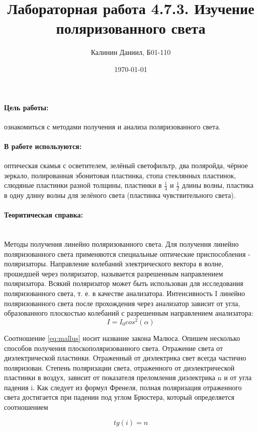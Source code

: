 \documentclass[a4paper, 12pt]{article}
\author{Калинин Даниил, Б01-110}
\date{\today}
\title{Лабораторная работа 4.7.3. Изучение поляризованного света}
\newcommand{\parag}[1]{\paragraph*{#1:}}
\begin{document}
\maketitle
\parindent=0cm

\parag {Цель работы}
ознакомиться с методами получения и анализа 
поляризованного света.

\parag {В работе используются}
оптическая скамья с осветителем,
зелёный светофильтр, два поляройда, чёрное зеркало, полированная
эбонитовая пластинка, стопа стеклянных пластинок, слюдяные пластинки
разной толщины, пластинки в $\frac{1}{4}$ и $\frac{1}{2}$ длины
волны, пластика в одну длину волны для зелёного света (пластинка
чувствительного света).

\parag {Теоритическая справка} ~\\
Методы получения линейно поляризованного света. Для получения 
линейно поляризованного света применяются специальные оптические 
приспособления - поляризаторы. Направление колебаний электрического
вектора в волне, прошедшей через поляризатор, называется разрешенным 
направлением поляризатора. Всякий поляризатор может быть использован
для исследования поляризованного света, т. е. в качестве анализатора.
Интенсивность I линейно поляризованного света после прохождения 
через анализатор зависит от угла, образованного плоскостью колебаний 
с разрешенным направлением анализатора:
\begin{equation}
    I = I_0 cos^2(\alpha)
    \label{eq:mallus}
\end{equation}

Соотношение \eqref{eq:mallus} носит название закона Малюса.
Опишем несколько способов получения плоскополяризованного света.
Отражение света от диэлектрической пластинки. Отраженный от диэлектрика
свет всегда частично поляризован. Степень поляризации света, отраженного
от диэлектрической пластинки в воздух, зависит от показателя 
преломления диэлектрика n и от угла падения i. Как следует из 
формул Френеля, полная поляризация отраженного света достигается
при падении под углом Брюстера, который определяется соотношением

\begin{equation*}
    tg(i) = n
\end{equation*}
\end{document}
